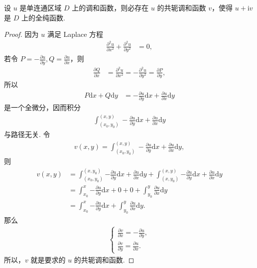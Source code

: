 \documentclass[../../main.tex]{subfiles}%
\begin{document}
\begin{theorem}
设 $u$ 是单连通区域 $D$ 上的调和函数，则必存在 $u$ 的共轭调和函数 $v$，使得 $u + \mathrm{i}v$ 是 $D$ 上的全纯函数.
\end{theorem}
\begin{proof}
因为 $u$ 满足 Laplace 方程
\begin{align*}
\frac{\partial^2 u}{\partial x^2} + \frac{\partial^2 u}{\partial y^2} &= 0,
\end{align*}
若令 $P = -\frac{\partial u}{\partial y}, Q = \frac{\partial u}{\partial x}$，则
\begin{align*}
\frac{\partial Q}{\partial x} &= \frac{\partial^2 u}{\partial x^2} = -\frac{\partial^2 u}{\partial y^2} = \frac{\partial P}{\partial y},
\end{align*}
所以
\begin{align*}
P \mathrm{d}x + Q \mathrm{d}y &= -\frac{\partial u}{\partial y} \mathrm{d}x + \frac{\partial u}{\partial x} \mathrm{d}y
\end{align*}
是一个全微分，因而积分
\begin{align*}
\int_{(x_0, y_0)}^{(x, y)} -\frac{\partial u}{\partial y} \mathrm{d}x + \frac{\partial u}{\partial x} \mathrm{d}y
\end{align*}
与路径无关. 令
\begin{align*}
v(x, y) = \int_{(x_0, y_0)}^{(x, y)} -\frac{\partial u}{\partial y} \mathrm{d}x + \frac{\partial u}{\partial x} \mathrm{d}y,
\end{align*}
则
\begin{align*}
v(x,y)&=\int_{(x_0,y_0)}^{(x,y_0)}{-\frac{\partial u}{\partial y}\mathrm{d}x+\frac{\partial u}{\partial x}\mathrm{d}y}+\int_{(x,y_0)}^{(x,y)}{-\frac{\partial u}{\partial y}\mathrm{d}x+\frac{\partial u}{\partial x}\mathrm{d}y}
\\
&=\int_{x_0}^x{-\frac{\partial u}{\partial y}\mathrm{d}x}+0+0+\int_{y_0}^y{\frac{\partial u}{\partial x}\mathrm{d}y}
\\
&=\int_{x_0}^x{-\frac{\partial u}{\partial y}\mathrm{d}x}+\int_{y_0}^y{\frac{\partial u}{\partial x}\mathrm{d}y}.
\end{align*}
那么
\begin{align*}
\begin{cases} 
\displaystyle \frac{\partial v}{\partial x} = -\frac{\partial u}{\partial y}, \\
\displaystyle \frac{\partial v}{\partial y} = \frac{\partial u}{\partial x}.
\end{cases}
\end{align*}
所以，$v$ 就是要求的 $u$ 的共轭调和函数.
\end{proof}
\end{document}
